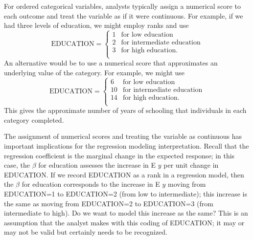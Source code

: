 
For ordered categorical variables, analysts typically assign a
numerical score to each outcome and treat the variable as if it were
continuous. For example, if we had three levels of education, we
might employ ranks and use
\begin{equation*}
\textrm{EDUCATION} = \left\{ \begin{array}{cl}
        1           & \textrm{for low education} \\
        2           & \textrm{for intermediate education} \\
        3           & \textrm{for high education.} \\
\end{array} \right.
\end{equation*}
An alternative would be to use a numerical score that approximates
an underlying value of the category. For example, we might use
\begin{equation*}
\textrm{EDUCATION} = \left\{ \begin{array}{cl}
        6           & \textrm{for low education} \\
        10           & \textrm{for intermediate education} \\
        14           & \textrm{for high education.} \\
\end{array} \right.
\end{equation*}
This gives the approximate number of years of schooling that
individuals in each category completed.

The assignment of numerical scores and treating the variable as
continuous has important implications for the regression modeling
interpretation. Recall that the regression coefficient is the
marginal change in the expected response; in this case, the $\beta$
for education assesses the increase in E $y$ per unit change in
EDUCATION. If we record EDUCATION as a rank in a regression model,
then the $\beta$ for education corresponds to the increase in E $y$
moving from EDUCATION=1 to EDUCATION=2 (from low to intermediate);
this increase is the same as moving from EDUCATION=2 to EDUCATION=3
(from intermediate to high). Do we want to model this increase as
the same? This is an assumption that the analyst makes with this
coding of EDUCATION; it may or may not be valid but certainly needs
to be recognized.

